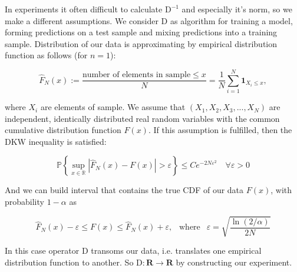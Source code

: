\documentclass{article}
\begin{document}
    In experiments it often difficult to calculate $\text{D}^{-1}$ and especially it's norm, so we make a different assumptions. We consider $\text{D}$ as algorithm for training a model, forming predictions on a test sample and mixing predictions into a training sample. Distribution of our data is approximating by empirical distribution function \cite{dvoretzky1956asymptotic} as follows (for $n=1$):

    \begin{equation}\label{F_approx}
        \hat{F}_N(x) := \dfrac{\text{number of elements in sample} \leq x}{N} = \dfrac{1}{N}\sum\limits_{i=1}^N \textbf{1}_{X_i \leq x},
    \end{equation}

    where $X_i$ are elements of sample. We assume that $(X_1, X_2, X_3, ... , X_N)$ are independent, identically distributed real random variables with the common cumulative distribution function $F(x)$. If this assumption is fulfilled, then the DKW inequality is satisfied:

    \begin{equation}\label{DKW}
        \mathbb{P}\left\{\underset{x \in \mathbb{R}}{\sup}\left|\hat{F}_N(x) - F(x)\right| > \varepsilon \right\} \leq C e^{-2N\varepsilon^2} \quad 
        \forall \varepsilon > 0
    \end{equation}

    And we can build interval that contains the true CDF of our data $F(x)$, with probability $1 - \alpha$ as

    \begin{equation}\label{inter}
        \hat{F}_N(x) - \varepsilon \leq F(x) \leq \hat{F}_N(x) + \varepsilon, ~~ \text{ where } ~~ \varepsilon = \sqrt{\dfrac{\ln(2/\alpha)}{2N}}
    \end{equation}

    In this case operator $\text{D}$ transoms our data, i.e. translates one empirical distribution function to another. So $\text{D} : \mathbf{R} \to \mathbf{R}$ by constructing our experiment.
\end{document}
